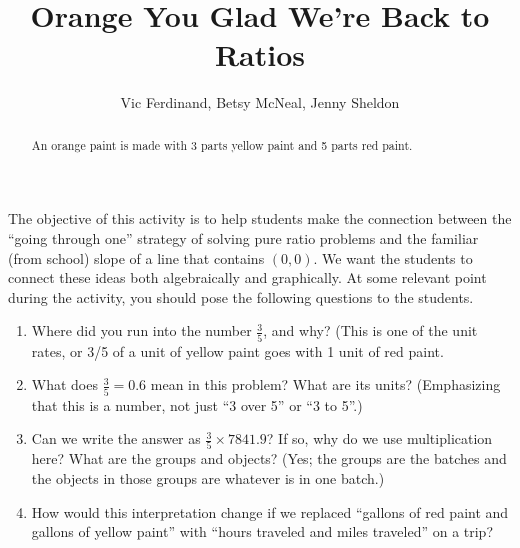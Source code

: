 \documentclass[nooutcomes, handout]{ximera}
\title{Orange You Glad We're Back to Ratios}
\author{Vic Ferdinand, Betsy McNeal, Jenny Sheldon}
\begin{document}
\begin{abstract}
An orange paint is made with 3 parts yellow paint and 5 parts red paint. 
\end{abstract}
\maketitle

\begin{instructorIntro}
The objective of this activity is to help students make the connection between the ``going through one'' strategy of solving pure ratio problems and the familiar (from school) slope of a line that contains $(0, 0)$.  We want the students to connect these ideas both algebraically and graphically.  At some relevant point during the activity, you should pose the following questions to the students.


\begin{enumerate}
    \item Where did you run into the number $\frac35$, and why?  (This is one of the unit rates, or 3/5 of a unit of yellow paint goes with 1 unit of red paint.
    \item What does $\frac35 = 0.6$ mean in this problem?  What are its units?  (Emphasizing that this is a number, not just ``3 over 5'' or ``3 to 5''.)
    \item Can we write the answer as $\frac35 \times 7841.9$? If so, why do we use multiplication here?  What are the groups and objects? (Yes; the groups are the batches and the objects in those groups are whatever is in one batch.)
    \item How would this interpretation change if we replaced ``gallons of red paint and gallons of yellow paint'' with ``hours traveled and miles traveled'' on a trip?
\end{enumerate}
\end{instructorIntro}
\end{document}
